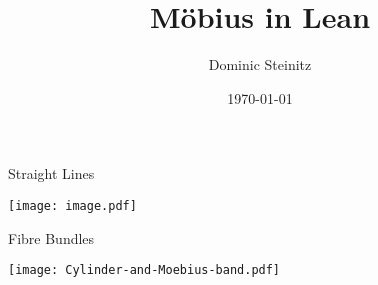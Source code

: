 \documentclass{beamer}
\begin{document}
\begin{frame}
    \title{Möbius in Lean}
    \author{Dominic Steinitz}
    \date{\today}
    \titlepage
\end{frame}

\begin{frame}{Straight Lines}
    \begin{center}
        \texttt{[image: image.pdf]}
    \end{center}
\end{frame}

\begin{frame}{Fibre Bundles}
    \begin{center}
        \texttt{[image: Cylinder-and-Moebius-band.pdf]}
    \end{center}
\end{frame}
\end{document}

